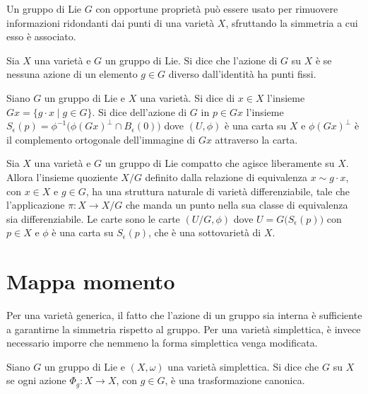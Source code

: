 Un gruppo di Lie $G$ con opportune proprietà può essere usato per rimuovere informazioni ridondanti dai punti di una varietà $X$, sfruttando la simmetria a cui esso è associato.
\begin{definition}
  Sia $X$ una varietà e $G$ un gruppo di Lie. Si dice che l'azione di $G$ su $X$ è  se nessuna azione di un elemento $g \in G$ diverso dall'identità ha punti fissi.
\end{definition}
\begin{definition}
  Siano $G$ un gruppo di Lie e $X$ una varietà. Si dice  di $x \in X$ l'insieme $Gx = \{g\cdot x\mid g \in G\}$. Si dice  dell'azione di $G$ in $p \in Gx$ l'insieme $S_{\epsilon}(p) = \phi^{-1}\big(\phi(Gx)^{\perp} \cap B_{\epsilon}(0)\big)$ dove $(U,\phi)$ è una carta su $X$ e $\phi(Gx)^{\perp}$ è il complemento ortogonale dell'immagine di $Gx$ attraverso la carta.
\end{definition}
\begin{theorem}
  Sia $X$ una varietà e $G$ un gruppo di Lie compatto che agisce liberamente su $X$. Allora l'insieme quoziente $X/G$ definito dalla relazione di equivalenza $x \sim g \cdot x$, con $x \in X$ e $g \in G$, ha una struttura naturale di varietà differenziabile, tale che l'applicazione $\pi:X \to X /G$ che manda un punto nella sua classe di equivalenza sia differenziabile. Le carte sono le carte $(U/G,\phi)$ dove $U = G\big(S_{\epsilon}(p)\big)$ con $p \in X$ e $\phi$ è una carta su $S_{\epsilon}(p)$, che è una sottovarietà di $X$.
\end{theorem}

\section{Mappa momento}
Per una varietà generica, il fatto che l'azione di un gruppo sia interna è sufficiente a garantirne la simmetria rispetto al gruppo. Per una varietà simplettica, è invece necessario imporre che nemmeno la forma simplettica venga modificata.
\begin{definition}
  Siano $G$ un gruppo di Lie e $(X, \omega)$ una varietà simplettica. Si dice che $G$  su $X$ se ogni azione $\Phi_g:X\to X$, con $g \in G$, è una trasformazione canonica.
\end{definition}

